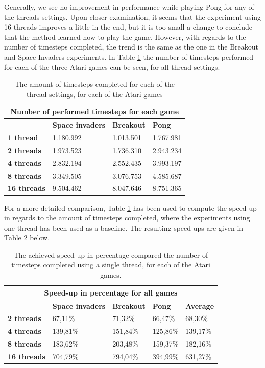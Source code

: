 \documentclass[11pt]{article}
\begin{document}
Generally, we see no improvement in performance while playing Pong for any of the threads settings.
Upon closer examination, it seems that the experiment using 16 threads improves a little
in the end, but it is too small a change to conclude that the method learned how to play the 
game.
However, with regards to the number of timesteps completed,
the trend is the same as the one in the Breakout and Space Invaders
experiments.
In Table \ref{table:compare_timesteps} the number of timesteps performed
for each of the three Atari games can be seen, for all thread settings.
\begin{table}[H]
\centering
\begin{tabular}{ |p{2cm}||p{3cm}|p{3cm}|p{3cm}|  }
 \hline
 \multicolumn{4}{|c|}{Number of performed timesteps for each game} \\
 \hline
  & \textbf{Space invaders}  & \textbf{Breakout} & \textbf{Pong}\\
 \hline
 \textbf{1 thread}   & 1.180.992    & 1.013.501&   1.767.981\\
 \hline
 \textbf{2 threads}&   1.973.523  & 1.736.310   & 2.943.234\\
 \hline
 \textbf{4 threads}& 2.832.194 & 2.552.435&  3.993.197\\
 \hline
 \textbf{8 threads}   & 3.349.505 & 3.076.753 &  4.585.687\\
 \hline
 \textbf{16 threads}&   9.504.462  & 8.047.646 & 8.751.365\\
 \hline
\end{tabular}
\caption{The amount of timesteps completed for each of the thread settings, for each of the Atari games}
\label{table:compare_timesteps}
\end{table}

For a more detailed comparison, Table \ref{table:compare_timesteps} has been used
to compute the speed-up in regards to the amount of timesteps completed,
where the experiments using one thread has been used as a baseline.
The resulting speed-ups are given in Table \ref{tab:speed-up} below.

\begin{table}[H]
\centering
\begin{tabular}{ |p{2cm}||p{2.8cm}|p{2.8cm}|p{2.8cm}|p{2.8cm}|  }
 \hline
 \multicolumn{5}{|c|}{Speed-up in percentage for all games} \\
 \hline
 & \textbf{Space invaders}  & \textbf{Breakout} & \textbf{Pong} & \textbf{Average}\\
 \hline
 \textbf{2 threads}&   67,11\%  & 71,32\%   & 66,47\% & 68,30\%\\
 \hline
 \textbf{4 threads}& 139,81\% & 151,84\% &  125,86\% & 139,17\%\\
 \hline
 \textbf{8 threads}   & 183,62\% & 203,48\% &  159,37\% & 182,16\%\\
 \hline
 \textbf{16 threads}&   704,79\%  & 794,04\% & 394,99\% & 631,27\%\\
 \hline
\end{tabular}
\caption{The achieved speed-up in percentage compared the number of timesteps completed using
a single thread, for each of the Atari games.}
\label{tab:speed-up}
\end{table}
\end{document}
